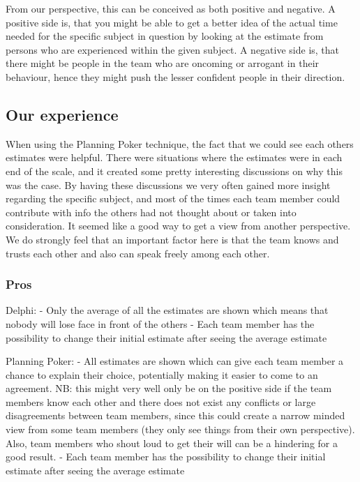 From our perspective, this can be conceived as both positive and negative. A positive side is, that you might be able to get a better idea of the actual time needed for the specific subject in question by looking at the estimate from persons who are experienced within the given subject. A negative side is, that there might be people in the team who are oncoming or arrogant in their behaviour, hence they might push the lesser confident people in their direction. 

\subsection{Our experience}


When using the Planning Poker technique, the fact that we could see each others estimates were helpful. There were situations where the estimates were in each end of the scale, and it created some pretty interesting discussions on why this was the case. By having these discussions we very often gained more insight regarding the specific subject, and most of the times each team member could contribute with info the others had not thought about or taken into consideration. It seemed like a good way to get a view from another perspective. We do strongly feel that an important factor here is that the team knows and trusts each other and also can speak freely among each other.



\subsubsection{Pros}

Delphi: 
- Only the average of all the estimates are shown which means that nobody will lose face in front of the others
- Each team member has the possibility to change their initial estimate after seeing the average estimate

Planning Poker:
- All estimates are shown which can give each team member a chance to explain their choice, potentially making it easier to come to an agreement. NB: this might very well only be on the positive side if the team members know each other and there does not exist any conflicts or large disagreements between team members, since this could create a narrow minded view from some team members (they only see things from their own perspective). Also, team members who shout loud to get their will can be a hindering for a good result.
- Each team member has the possibility to change their initial estimate after seeing the average estimate



